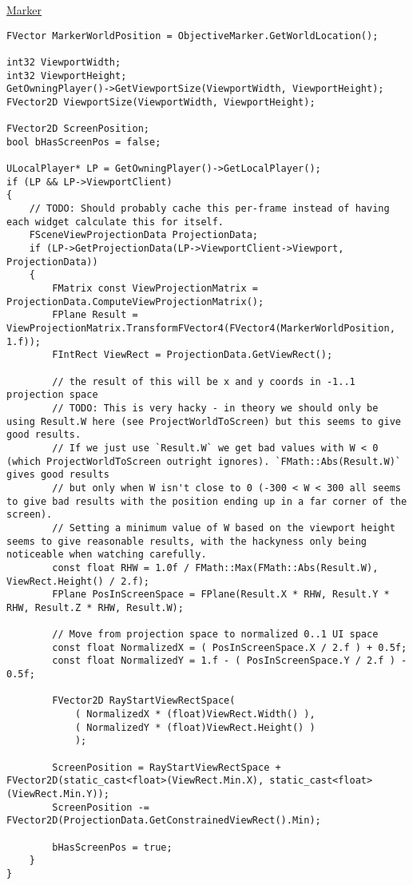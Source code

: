\uline{Marker}
\begin{lstlisting}
FVector MarkerWorldPosition = ObjectiveMarker.GetWorldLocation();

int32 ViewportWidth;
int32 ViewportHeight;
GetOwningPlayer()->GetViewportSize(ViewportWidth, ViewportHeight);
FVector2D ViewportSize(ViewportWidth, ViewportHeight);

FVector2D ScreenPosition;
bool bHasScreenPos = false;

ULocalPlayer* LP = GetOwningPlayer()->GetLocalPlayer();
if (LP && LP->ViewportClient)
{
    // TODO: Should probably cache this per-frame instead of having each widget calculate this for itself.
    FSceneViewProjectionData ProjectionData;
    if (LP->GetProjectionData(LP->ViewportClient->Viewport, ProjectionData))
    {
        FMatrix const ViewProjectionMatrix = ProjectionData.ComputeViewProjectionMatrix();
        FPlane Result = ViewProjectionMatrix.TransformFVector4(FVector4(MarkerWorldPosition, 1.f));
        FIntRect ViewRect = ProjectionData.GetViewRect();

        // the result of this will be x and y coords in -1..1 projection space
        // TODO: This is very hacky - in theory we should only be using Result.W here (see ProjectWorldToScreen) but this seems to give good results.
        // If we just use `Result.W` we get bad values with W < 0 (which ProjectWorldToScreen outright ignores). `FMath::Abs(Result.W)` gives good results
        // but only when W isn't close to 0 (-300 < W < 300 all seems to give bad results with the position ending up in a far corner of the screen).
        // Setting a minimum value of W based on the viewport height seems to give reasonable results, with the hackyness only being noticeable when watching carefully.
        const float RHW = 1.0f / FMath::Max(FMath::Abs(Result.W), ViewRect.Height() / 2.f);
        FPlane PosInScreenSpace = FPlane(Result.X * RHW, Result.Y * RHW, Result.Z * RHW, Result.W);

        // Move from projection space to normalized 0..1 UI space
        const float NormalizedX = ( PosInScreenSpace.X / 2.f ) + 0.5f;
        const float NormalizedY = 1.f - ( PosInScreenSpace.Y / 2.f ) - 0.5f;

        FVector2D RayStartViewRectSpace(
            ( NormalizedX * (float)ViewRect.Width() ),
            ( NormalizedY * (float)ViewRect.Height() )
            );

        ScreenPosition = RayStartViewRectSpace + FVector2D(static_cast<float>(ViewRect.Min.X), static_cast<float>(ViewRect.Min.Y));
        ScreenPosition -= FVector2D(ProjectionData.GetConstrainedViewRect().Min);

        bHasScreenPos = true;
    }
}
\end{lstlisting}


